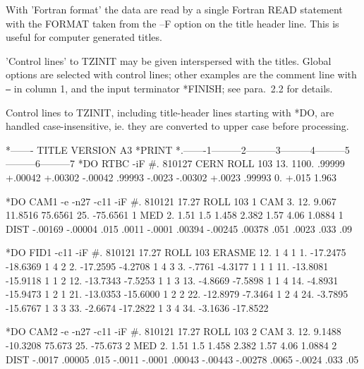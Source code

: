 {With 'Fortran format' the data are read by a single
Fortran READ statement with the FORMAT taken from the --F option on
the title header line.
This is useful for computer generated titles.

'Control lines' to TZINIT may be given interspersed
with the titles.
Global options are selected with control lines;
other examples are the comment line with  {\tt *--}  in column 1,
and the input terminator *FINISH;
see para.~2.2 for details.

Control lines to TZINIT, including title-header lines starting
with *DO, are handled case-insensitive, ie. they are converted
to upper case before processing.

\newpage
\bvc
*-------            TITLE VERSION A3
*PRINT
*.-------1---------2---------3---------4---------5---------6---------7
*DO  RTBC  -iF                   #. 810127     CERN  ROLL 103
13.       1100.
            .99999  +.00042  +.00302
           -.00042   .99993  -.0023
           -.00302  +.0023    .99993     0.     +.015     1.963

*DO  CAM1  -e -n27 -c11 -iF      #. 810121 17.27  ROLL 103
 1 CAM       3.  12.    9.067    11.8516   75.6561     25.    -75.6561
 1 MED       2.        1.51      1.5       1.458     2.382     1.57
             4.06      1.0884
 1 DIST       -.00169     -.00004      .015        .0011      -.0001
               .00394     -.00245      .00378      .051        .0023
               .033        .09

*DO  FID1  -c11 -iF              #. 810121 17.27  ROLL 103  ERASME
            12.
 1 4   1     1.  -17.2475  -18.6369
 1 4   2     2.  -17.2595   -4.2708
 1 4   3     3.    -.7761   -4.3177
 1 1   1    11.  -13.8081  -15.9118
 1 1   2    12.  -13.7343   -7.5253
 1 1   3    13.   -4.8669   -7.5898
 1 1   4    14.   -4.8931  -15.9473
 1 2   1    21.  -13.0353  -15.6000
 1 2   2    22.  -12.8979   -7.3464
 1 2   4    24.   -3.7895  -15.6767
 1 3   3    33.   -2.6674  -17.2822
 1 3   4    34.   -3.1636  -17.8522

*DO  CAM2  -e -n27 -c11 -iF      #. 810121 17.27  ROLL 103
 2 CAM       3.  12.    9.1488  -10.3208   75.673      25.    -75.673
 2 MED       2.        1.51      1.5       1.458     2.382     1.57
             4.06      1.0884
 2 DIST       -.0017       .00005      .015       -.0011      -.0001
               .00043     -.00443     -.00278      .0065      -.0024
               .033        .05

}
